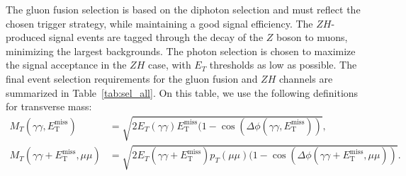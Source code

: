 \documentclass[11pt]{article}
\newcommand{\MET}{\ensuremath{E_{\mathrm{T}}^{\mathrm{miss}}}\xspace}
\begin{document}
The gluon fusion selection is based on the diphoton selection and must reflect the chosen trigger strategy, while maintaining a good signal efficiency. 
%
%
%
The $ZH$-produced signal events are tagged through the decay of the $Z$ boson to muons, minimizing the largest backgrounds. 
The photon selection is chosen to maximize the signal acceptance in the $ZH$ case, with $E_{T}$ thresholds as low as possible. 
%
The final event selection requirements for the gluon fusion  and $ZH$ channels are summarized in Table~\ref{tab:sel_all}. On this table, we use the following definitions for transverse mass:
\begin{align}
M_{T}(\gamma\gamma,\MET) &= \sqrt{2E_{T}(\gamma\gamma)\MET(1-\cos(\Delta\phi(\gamma\gamma,\MET))}, \\
M_{T}(\gamma\gamma+\MET, \mu\mu) &= \sqrt{2E_{T}(\gamma\gamma+\MET)p_{T}(\mu\mu)(1-\cos(\Delta\phi(\gamma\gamma+\MET,\mu\mu))}.
\end{align}
\end{document}
